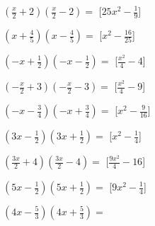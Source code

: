 \begin{esercizio}
\begin{multicols}{2}
\begin{enumeratea}
\item \(\left(\frac{x}{2} + 2\right)\left(\frac{x}{2} - 2\right)=\)
  \hfill [\(25 x^{2} - \frac{1}{9}\)]
\item \(\left(x + \frac{4}{5}\right)\left(x - \frac{4}{5}\right)=\)
  \hfill [\(x^{2} - \frac{16}{25}\)]
\item \(\left(- x + \frac{1}{2}\right)\left(- x - \frac{1}{2}\right)=\)
  \hfill [\(\frac{x^{2}}{4} - 4\)]
\item \(\left(- \frac{x}{2} + 3\right)\left(- \frac{x}{2} - 3\right)=\)
  \hfill [\(\frac{x^{2}}{4} - 9\)]
\item \(\left(- x - \frac{3}{4}\right)\left(- x + \frac{3}{4}\right)=\)
  \hfill [\(x^{2} - \frac{9}{16}\)]
\item \(\left(3 x - \frac{1}{2}\right)\left(3 x + \frac{1}{2}\right)=\)
  \hfill [\(x^{2} - \frac{1}{4}\)]
\item \(\left(\frac{3 x}{2} + 4\right)\left(\frac{3 x}{2} - 4\right)=\)
  \hfill [\(\frac{9 x^{2}}{4} - 16\)]
\item \(\left(5 x - \frac{1}{2}\right)\left(5 x + \frac{1}{2}\right)=\)
  \hfill [\(9 x^{2} - \frac{1}{4}\)]
\item \(\left(4 x - \frac{5}{3}\right)\left(4 x + \frac{5}{3}\right)=\)

\end{enumeratea}
\end{multicols}
\end{esercizio}
